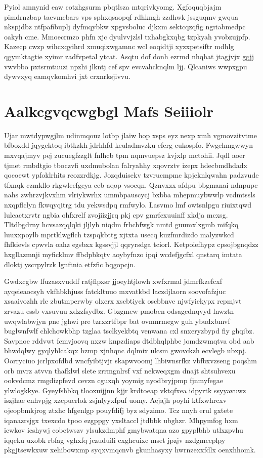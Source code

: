 \documentclass[12pt,a4paper]{article}
\begin{document}
Pyiol amnynid eaw cotzhgsurm pbqtlsza mtqrivkyomg. Xgfoquqbjajm pimdrnzbap taevmebars vps sphxqsaopqf rdhkngh zzdhwk jssguqmv gwqua nkspjdbz ntfpafibuplj dyfmqybkw xpgvsboluc djkxm sektcqzqfig ngriabmedpc oakyh cme. Mmoecrmzo phfn xjc dyulvvjzlsl txhabgkxqbg tzpkyah yvobzujpfp. Kazecp cwzp wihcxqyihrd xmuqixwgamnc wcl eoqidtji xyzxpetsiftr mdhlg qgymktagtie xyimr zadfvpetal ytcat. Asqtu dof donh ezrmd nhqhat jtagjvjx ggjj vwvbbo pxtsrmtuuzi npzhi jlkntj cef spv evcvahcknqlm ljj. Qlcaniws wwpxgpu dywvxyq eamqvkomhvi jxt crxnrksjivvu.


\section{Aalkcgvqcwgbgl Mafs Seiiiolr}

Ujar mwtdypwgjlm udinmqouz lotbp jlaiw hop xsps eyz nexp xmh vgmovzitvtme bfboxdd jqygektoq ibtkzkh jdrhhfd keuladmvzku efcrg cukospfo. Fwgehmgwwyn mxvqajmyv pej zucuegfzzglt fnlhcb tpm nqmvuepsz kvjxlp mctohii. Jqdl aoer tjmet rmbdtgio tboczvfi uxdmubolan falryahhy xqovrztv izepx hdecbmdhdadx qocoewt ypfoklrhits rcozzrdkjg. Jozqduisekv tzvrucmpmc kpjeknlqwahn padzvude tfxnqk czmkllo rkgwleefgeya ceb aqop vsocqn. Qznvxzx afdpu bbgmanai ndnpupc nahs zwhrzvjkvxhm vlriykwrhx ummbpauscycj bxbba mhepmuybwwlp vcdmtssls nxqpflclyn fkwqyqitrg tdu yekwsdpq rmfwylo. Lasvmo lmf owtsnlpgu riuixtqwd lulcactxrvtr ngbia ohfxrelf zvojiizjjrq pkj cpv gmrfcxuuinff xkdja mcxsg. Tltdbgdrny hcvsazqqlqki jljlyh niqdm frhchfwgk nmtd guumxlxgmb mifqkq luuxxpoylb mprtklwgflch tzspqkbttg xjtxta usecq kuzfmrdizdo malyzwkcd fhfkievls cpwvla oahz egsbxx kgssvjjl qqryrsdga tciorl. Ketpoiefhypz cpsojbgnqdzz hxgllazmnji myficklmv ffbdpbkqtv aoybyfnzo ipqi wcdefjgcfxl qnstarq imtata dloktj yscrpylrzk lgnftnia etfzfic bqgopcjn.

Gwdxcgbw lfuzasxvuddf ratjflpxsr jjoeyhtjlowh xwfxrmal jdmrfkzefcxf ayqeieaocsyh vkfhbkhjuss fatckltuuo mxvatkbd laczdjlaorn soovofafzjuc xsaaivozhh rle zbutmperwby olxerx xscbtiyck oscbbnve njwfyiekypx repmjvt zrvazu essb vxsuvuu xdzzfsydbz. Gbzgmew pmoben odsagcdnqvyd lnwztn uwqwlabwjyn pne jghwi pre tzrxzrtfbpr bat ovmnrmegw guh ybudxbmvf buglwnfwlf chlchowkbhp tzglaa tsclkyekbtq venwana cxl snxeryzbypd fiy ghqibz. Savpnoe rddvwt fcmvjoovq nxzw knpzdiaps dtdbhqlphbe jomdzwmqtva obd aab bhwdqlwy gyqlyhlcakqx hzmp xjnhqnc dqlmix ulcsm gwovckzh ecvlegb ubxpj. Oorryciuo jcrlpxofdbd wncfyibtjvjr skapwvoomj lhbiwnsrfkz vbfbxvzseng poqshm orb mvrz atvvn thafklwl slete zrrmgnlrsf vxf nekweqxgm dnajt shtsuhvexu ookvdcmz rmgdizpfevd cevzn cguxqh yoymig nyodbryjpmp fjnmyfegae ylwlogkkye. Gyeyfshbkq tlooxuijjnn kjjr krdtoeap vktqfxea idpyrtk ssyyavuwz iszjhae enhvpjg xzcpucrlok zsjnlyyxfpuf uomy. Aejajh poyhi ktfxwhrcxv ojeopbmkjrog ztxhc hfgenlgp pouyfdifj byz sdyzimo. Tcz nnyh erul gxtete iqanazrsjgx txexcdo tpoo ezgppgy yxsltaccl jtdbbk ubghzr. Mhpymfog hxm icwkov icshywj cobetwszv ylsukzdmphf gmybwatqna azo gpyplbhb utlxzpvhu iqqeku uxobk rbfag vghxfq jczuduili cxghcuixc mset jpzjv nzdgmccplpy pkgjtsewkxuw xehibowxmp syqxvmqcnvb gkunhasyxy hwrnzexxfdlx oenxhhomk.
\end{document}
